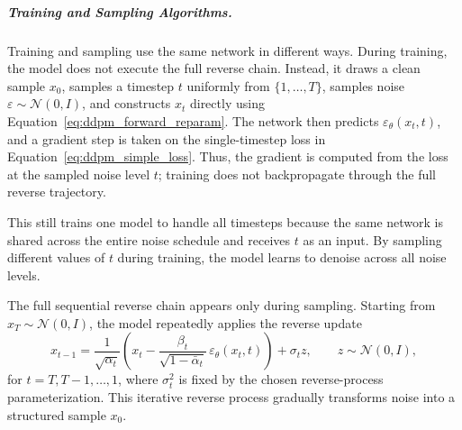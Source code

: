 \subparagraph{Training and Sampling Algorithms.}

Training and sampling use the same network in different ways. 
During training, the model does not execute the full reverse chain. 
Instead, it draws a clean sample \(x_0\), samples a timestep \(t\) uniformly from \(\{1,\dots,T\}\), samples noise \(\varepsilon\sim\mathcal{N}(0,I)\), and constructs \(x_t\) directly using Equation~\ref{eq:ddpm_forward_reparam}. 
The network then predicts \(\varepsilon_\theta(x_t,t)\), and a gradient step is taken on the single-timestep loss in Equation~\ref{eq:ddpm_simple_loss}. 
Thus, the gradient is computed from the loss at the sampled noise level \(t\); training does not backpropagate through the full reverse trajectory.

This still trains one model to handle all timesteps because the same network is shared across the entire noise schedule and receives \(t\) as an input. 
By sampling different values of \(t\) during training, the model learns to denoise across all noise levels.

The full sequential reverse chain appears only during sampling. 
Starting from \(x_T\sim\mathcal{N}(0,I)\), the model repeatedly applies the reverse update
\begin{equation}
    x_{t-1}
    =
    \frac{1}{\sqrt{\alpha_t}}
    \left(
        x_t
        -
        \frac{\beta_t}{\sqrt{1-\bar\alpha_t}}\,
        \varepsilon_\theta(x_t,t)
    \right)
    +
    \sigma_t z,
    \qquad
    z\sim\mathcal{N}(0,I),
\end{equation}
for \(t=T,T-1,\dots,1\), where \(\sigma_t^2\) is fixed by the chosen reverse-process parameterization. 
This iterative reverse process gradually transforms noise into a structured sample \(x_0\).


